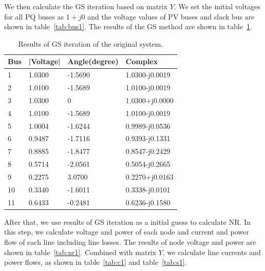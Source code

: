 \documentclass[conference]{IEEEtran}
\begin{document}
We then calculate the GS iteration based on matrix $Y$. We set the initial voltages for all PQ buses as $1+j0$ and the voltage values of PV buses and slack bus are shown in table~\ref{tab:bus1}. The results of the GS method are shown in table~\ref{tab:gs}.

\begin{table}[H]
	\begin{center}
		\begin{tabular}{|l|l|l|l|}
			\hline
			Bus & |Voltage| & Angle(degree) & Complex \\ \hline
			1 & 1.0300 & -1.5690 & 1.0300-j0.0019 \\ \hline
			2 & 1.0100 & -1.5689 & 1.0100-j0.0019 \\ \hline
			3 & 1.0300 & 0 & 1.0300+j0.0000 \\ \hline
			4 & 1.0100 & -1.5689 & 1.0100-j0.0019 \\ \hline
			5 & 1.0004 & -1.6244 & 0.9989-j0.0536 \\ \hline
			6 & 0.9487 & -1.7116 & 0.9393-j0.1331 \\ \hline
			7 & 0.8885 & -1.8477 & 0.8547-j0.2429 \\ \hline
			8 & 0.5714 & -2.0561 & 0.5054-j0.2665 \\ \hline
			9 & 0.2275 & 3.0700 & 0.2270+j0.0163 \\ \hline
			10 & 0.3340 & -1.6011 & 0.3338-j0.0101 \\ \hline
			11 & 0.6433 & -0.2481 & 0.6236-j0.1580 \\ \hline
		\end{tabular}
	\end{center}
	\caption{Results of GS iteration of the original system.}
	\vspace{-8mm}
	\label{tab:gs}
\end{table}

After that, we use results of GS iteration as a initial guess to calculate NR. In this step, we calculate voltage and power of each node and current and power flow of each line including line losses. The results of node voltage and power are shown in table~\ref{tab:nr1}. Combined with matrix $Y$, we calculate line currents and power flows, as shown in table~\ref{tab:c1} and table~\ref{tab:s1}.
\end{document}
